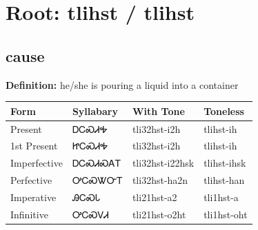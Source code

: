 \documentclass{article}%
\begin{document}
%
\normalsize%
\section*{Root: tlihst / tlihst}%
\subsection*{cause}%
\textbf{Definition: }%
he/she is pouring a liquid into a container%
\\[0.5em]%
\begin{tabular}{|l|l|l|l|}%
\hline%
\textbf{Form}&\textbf{Syllabary}&\textbf{With Tone}&\textbf{Toneless}\\%
\hline%
Present&ᎠᏟᏍᏗᎭ&tli32hst{-}i2h&tlihst{-}ih\\%
1st Present&ᏥᏟᏍᏗᎭ&tli32hst{-}i2h&tlihst{-}ih\\%
Imperfective&ᎠᏟᏍᏗᏍᎪᎢ&tli32hst{-}i22hsk&tlihst{-}ihsk\\%
Perfective&ᎤᏟᏍᏔᏅᎢ&tli32hst{-}ha2n&tlihst{-}han\\%
Imperative&ᎯᏟᏍᏓ&tli21hst{-}a2&tli1hst{-}a\\%
Infinitive&ᎤᏟᏍᏙᏗ&tli21hst{-}o2ht&tli1hst{-}oht\\%
\hline%
\end{tabular}%
\\[1em]%
\end{document}
